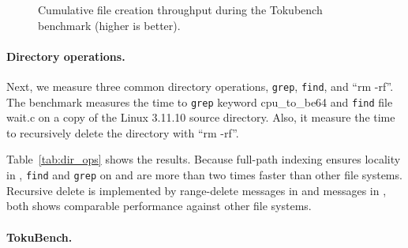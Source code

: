 \begin{figure}[t]
    \caption[TokuBench benchmark]{\label{fig:toku}
        Cumulative file creation throughput during the Tokubench benchmark (higher is better).}
\end{figure}

\paragraph{Directory operations.}
Next, we measure three common directory operations,
\texttt{grep}, \texttt{find}, and ``rm -rf''.
The benchmark measures the time to \texttt{grep} keyword cpu\_to\_be64 and
\texttt{find} file wait.c on a copy of the Linux 3.11.10 source directory.
Also, it measure the time to recursively delete the directory with ``rm -rf''.

Table~\ref{tab:dir_ops} shows the results.
Because full-path indexing ensures locality in \betrfs, \texttt{find} and
\texttt{grep} on \betrfsFour and \betrfsFive are more than two times faster than
other file systems.
Recursive delete is implemented by range-delete messages in \betrfsFour and
\goto messages in \betrfsFive, both shows comparable performance against other
file systems.

\paragraph{TokuBench.}

